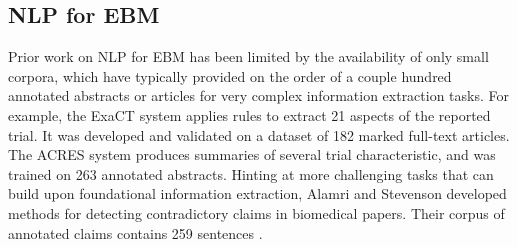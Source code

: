 \documentclass[11pt,a4paper]{article}
\begin{document}
\subsection{NLP for EBM}
Prior work on NLP for EBM has been limited by the availability of only small corpora, which have typically provided on the order of a couple hundred annotated abstracts or articles for very complex information extraction tasks. For example, the ExaCT system \cite{kiritchenko2010exact} applies rules to extract 21 aspects of the reported trial. It was developed and validated on a dataset of 182 marked full-text articles. The ACRES system \cite{summerscales2011automatic} produces summaries of several trial characteristic, and was %
trained on 263 annotated abstracts.
Hinting at more challenging tasks that can build upon foundational information extraction, Alamri and Stevenson  developed methods for detecting contradictory claims in biomedical papers. Their corpus of annotated claims contains 259 sentences \cite{alamri2016corpus}.


\end{document}
